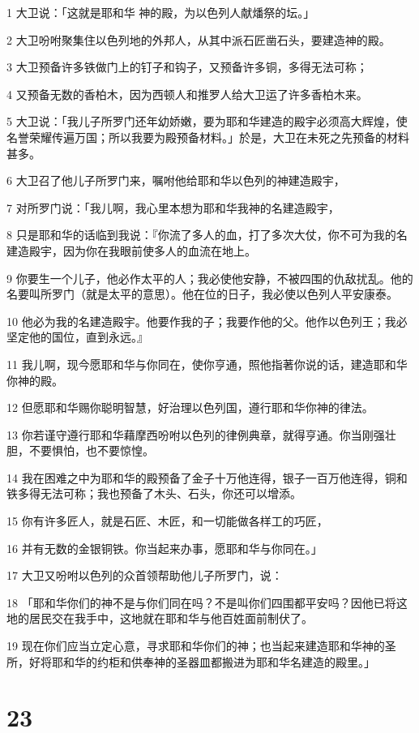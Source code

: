 \par 1 大卫说：「这就是耶和华 神的殿，为以色列人献燔祭的坛。」
\par 2 大卫吩咐聚集住以色列地的外邦人，从其中派石匠凿石头，要建造神的殿。
\par 3 大卫预备许多铁做门上的钉子和钩子，又预备许多铜，多得无法可称；
\par 4 又预备无数的香柏木，因为西顿人和推罗人给大卫运了许多香柏木来。
\par 5 大卫说：「我儿子所罗门还年幼娇嫩，要为耶和华建造的殿宇必须高大辉煌，使名誉荣耀传遍万国；所以我要为殿预备材料。」於是，大卫在未死之先预备的材料甚多。
\par 6 大卫召了他儿子所罗门来，嘱咐他给耶和华以色列的神建造殿宇，
\par 7 对所罗门说：「我儿啊，我心里本想为耶和华我神的名建造殿宇，
\par 8 只是耶和华的话临到我说：『你流了多人的血，打了多次大仗，你不可为我的名建造殿宇，因为你在我眼前使多人的血流在地上。
\par 9 你要生一个儿子，他必作太平的人；我必使他安静，不被四围的仇敌扰乱。他的名要叫所罗门（就是太平的意思）。他在位的日子，我必使以色列人平安康泰。
\par 10 他必为我的名建造殿宇。他要作我的子；我要作他的父。他作以色列王；我必坚定他的国位，直到永远。』
\par 11 我儿啊，现今愿耶和华与你同在，使你亨通，照他指著你说的话，建造耶和华你神的殿。
\par 12 但愿耶和华赐你聪明智慧，好治理以色列国，遵行耶和华你神的律法。
\par 13 你若谨守遵行耶和华藉摩西吩咐以色列的律例典章，就得亨通。你当刚强壮胆，不要惧怕，也不要惊惶。
\par 14 我在困难之中为耶和华的殿预备了金子十万他连得，银子一百万他连得，铜和铁多得无法可称；我也预备了木头、石头，你还可以增添。
\par 15 你有许多匠人，就是石匠、木匠，和一切能做各样工的巧匠，
\par 16 并有无数的金银铜铁。你当起来办事，愿耶和华与你同在。」
\par 17 大卫又吩咐以色列的众首领帮助他儿子所罗门，说：
\par 18 「耶和华你们的神不是与你们同在吗？不是叫你们四围都平安吗？因他已将这地的居民交在我手中，这地就在耶和华与他百姓面前制伏了。
\par 19 现在你们应当立定心意，寻求耶和华你们的神；也当起来建造耶和华神的圣所，好将耶和华的约柜和供奉神的圣器皿都搬进为耶和华名建造的殿里。」

\chapter{23}

